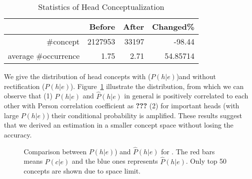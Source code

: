 \begin{table}[htbp]
  \centering
  \caption{Statistics of Head Conceptualization}
    \begin{tabular}{rrrr}
    \toprule
          & Before & After & Changed\% \\
    \midrule
    \#concept & 2127953 & 33197 & -98.44 \\
    average \#occurrence & 1.75  & 2.71  & 54.85714 \\
    \bottomrule
    \end{tabular}%
  \label{tab:nhc}%
\end{table}%


We give the distribution of head concepts with ($P(h|e)$)and without rectification ($\hat{P}(h|e)$).  Figure~\ref{fig:hac} illustrate the distribution, from which we can observe that (1) $P(h|e)$ and $\hat{P}(h|e)$ in general is positively correlated to each other with Person correlation coefficient as {\bf ???} (2) for important heads (with large $P(h|e)$) their conditional probability is amplified. These results suggest that we derived an estimation in a smaller concept space without losing the accuracy.


\begin{figure}[!htb]
\centering
{}
\caption{Comparison between $P(h|e)$) and $\hat{P}(h|e)$ for . \small The red bars means $P(c|e)$ and the blue ones represents $\hat{P}(h|e)$. Only top 50 concepts are shown due to space limit.  }
\label{fig:hac}
\vspace{-6mm}
\end{figure}

